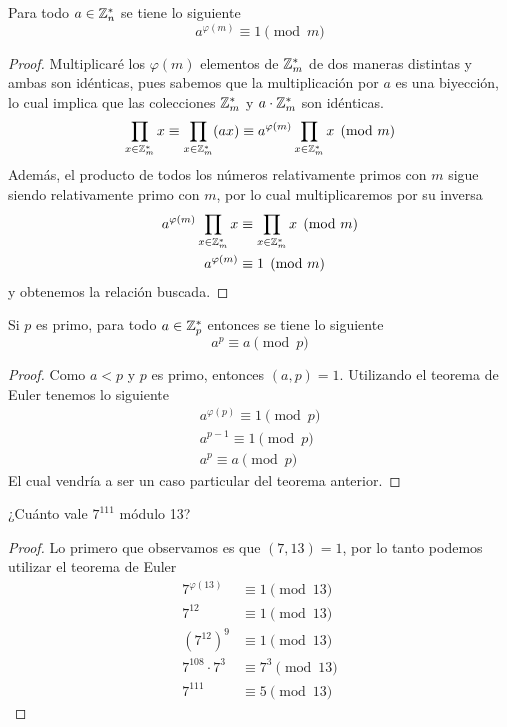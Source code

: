 \documentclass[main.tex]{subfiles}
\begin{document}
\begin{theorem}
    Para todo $a \in \mathbb Z_n^*$ se tiene lo siguiente
    $$a^{\varphi(m)}\equiv 1\pmod{m}$$
\end{theorem}

\begin{proof}
    Multiplicar\'e los $\varphi(m)$ elementos de $\mathbb Z_m^*$ de dos maneras distintas y ambas son id\'enticas, pues sabemos que la multiplicaci\'on por $a$ es una biyecci\'on, lo cual implica que las colecciones $\mathbb Z_m^*$ y $a\cdot\mathbb Z_m^*$ son id\'enticas.
    $$\prod_{x \in \mathbb Z_m^*} x \equiv \prod_{x \in \mathbb Z_m^*} (ax) \equiv a^{\varphi(m)}\prod_{x \in \mathbb Z_m^*}x \pmod{m}$$
    Adem\'as, el producto de todos los n\'umeros relativamente primos con $m$ sigue siendo relativamente primo con $m$, por lo cual multiplicaremos por su inversa
    \begin{align*}
        a^{\varphi(m)}\prod_{x\in\mathbb Z_m^*}x&\equiv\prod_{x\in\mathbb Z_m^*}x\pmod{m}\\
        a^{\varphi(m)}&\equiv1\pmod{m}
    \end{align*}
    y obtenemos la relaci\'on buscada.
\end{proof}

\begin{corollary}
    Si $p$ es primo, para todo $a \in \mathbb Z_p^*$ entonces se tiene lo siguiente
    $$a^p\equiv a\pmod{p}$$
\end{corollary}

\begin{proof}
    Como $a < p$ y $p$ es primo, entonces $(a, p) = 1$. Utilizando el teorema de Euler tenemos lo siguiente
    \begin{align*}
        a^{\varphi(p)}\equiv1\pmod{p}\\
        a^{p-1}\equiv1\pmod{p}\\
        a^p\equiv a\pmod{p}
    \end{align*}
    El cual vendr\'ia a ser un caso particular del teorema anterior.
\end{proof}

\begin{example}
    ¿Cu\'anto vale $7^{111}$ m\'odulo 13?
\end{example}

\begin{proof}
    Lo primero que observamos es que $(7, 13) = 1$, por lo tanto podemos utilizar el teorema de Euler
    \begin{align*}
        7^{\varphi(13)}&\equiv 1\pmod{13}\\
        7^{12}&\equiv 1\pmod{13}\\
        (7^{12})^9 &\equiv 1\pmod{13}\\
        7^{108}\cdot 7^3 &\equiv 7^3\pmod{13}\\
        7^{111} &\equiv 5\pmod{13} 
    \end{align*}
\end{proof}
\end{document}
